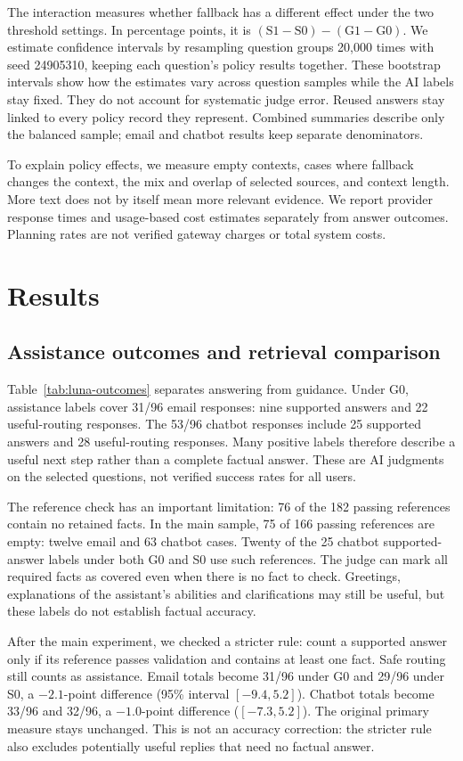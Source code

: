 \documentclass[a4paper,10pt,twocolumn]{article}
\begin{document}
The interaction measures whether fallback has a different effect under the two threshold settings. In percentage points, it is $(\mathrm{S1}-\mathrm{S0})-(\mathrm{G1}-\mathrm{G0})$. We estimate confidence intervals by resampling question groups 20,000 times with seed 24905310, keeping each question's policy results together. These bootstrap intervals show how the estimates vary across question samples while the AI labels stay fixed. They do not account for systematic judge error. Reused answers stay linked to every policy record they represent. Combined summaries describe only the balanced sample; email and chatbot results keep separate denominators.

To explain policy effects, we measure empty contexts, cases where fallback changes the context, the mix and overlap of selected sources, and context length. More text does not by itself mean more relevant evidence. We report provider response times and usage-based cost estimates separately from answer outcomes. Planning rates are not verified gateway charges or total system costs.

\section{Results}
\subsection{Assistance outcomes and retrieval comparison}
Table~\ref{tab:luna-outcomes} separates answering from guidance. Under G0, assistance labels cover 31/96 email responses: nine supported answers and 22 useful-routing responses. The 53/96 chatbot responses include 25 supported answers and 28 useful-routing responses. Many positive labels therefore describe a useful next step rather than a complete factual answer. These are AI judgments on the selected questions, not verified success rates for all users.

The reference check has an important limitation: 76 of the 182 passing references contain no retained facts. In the main sample, 75 of 166 passing references are empty: twelve email and 63 chatbot cases. Twenty of the 25 chatbot supported-answer labels under both G0 and S0 use such references. The judge can mark all required facts as covered even when there is no fact to check. Greetings, explanations of the assistant's abilities and clarifications may still be useful, but these labels do not establish factual accuracy.

After the main experiment, we checked a stricter rule: count a supported answer only if its reference passes validation and contains at least one fact. Safe routing still counts as assistance. Email totals become 31/96 under G0 and 29/96 under S0, a $-2.1$-point difference (95\% interval $[-9.4,5.2]$). Chatbot totals become 33/96 and 32/96, a $-1.0$-point difference ($[-7.3,5.2]$). The original primary measure stays unchanged. This is not an accuracy correction: the stricter rule also excludes potentially useful replies that need no factual answer.
\end{document}

